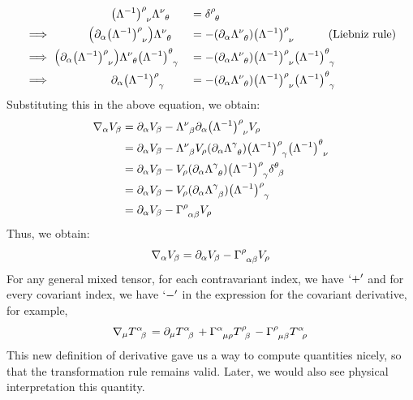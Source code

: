 \begin{alignat*}{2}
    &\qquad\qquad\ \ \ \itrmat{\rho}{\nu}\trmat{\nu}{\theta} &&= \tensor{\delta}{^\rho _\theta} \\
    \implies\ &\qquad\quad\qty(\partial_\alpha \itrmat{\rho}{\nu}) \trmat{\nu}{\theta} &&= -\qty(\partial_\alpha \trmat{\nu}{\theta})\itrmat{\rho}{\nu} \qquad\quad  (\text{Liebniz rule})\\
    \implies\ &\qty(\partial_\alpha \itrmat{\rho}{\nu}) \trmat{\nu}{\theta} \itrmat{\theta}{\gamma} &&= -\qty(\partial_\alpha \trmat{\nu}{\theta})\itrmat{\rho}{\nu}\itrmat{\theta}{\gamma} \\
    \implies\ &\qquad\qquad\ \ \ \partial_\alpha \itrmat{\rho}{\gamma} &&= - \qty(\partial_\alpha \trmat{\nu}{\theta})\itrmat{\rho}{\nu}\itrmat{\theta}{\gamma}
\end{alignat*}
Substituting this in the above equation, we obtain:
\begin{align*}
    \covd{\alpha}   V_\beta &= \partial_\alpha V_\beta -\trmat{\nu}{\beta}\partial_\alpha \itrmat{\rho}{\nu}V_\rho\\
&=\partial_\alpha V_\beta -\trmat{\nu}{\beta}V_\rho (\partial_\alpha \trmat{\gamma}{\theta})\itrmat{\rho}{\gamma}\itrmat{\theta}{\nu}\\
&=\partial_\alpha V_\beta -V_\rho (\partial_\alpha \trmat{\gamma}{\theta})\itrmat{\rho}{\gamma}\tensor{\delta}{^\theta _\beta}\\
&=\partial_\alpha V_\beta -V_\rho (\partial_\alpha \trmat{\gamma}{\beta})\itrmat{\rho}{\gamma}\\
&=\partial_\alpha V_\beta -\chris{\rho}{\alpha}{\beta} V_\rho
\end{align*}
Thus, we obtain:
$$\covd{\alpha}   V_\beta =\partial_\alpha V_\beta -\chris{\rho}{\alpha}{\beta} V_\rho $$
For any general mixed tensor, for each contravariant index, we have $`+'$ and for every covariant index, we have $`-'$ in the expression for the covariant derivative, for example,
$$\covd{\mu}\tensor{T}{^\alpha _\beta} = \partial_\mu \tensor{T}{^\alpha _\beta} + \chris{\alpha}{\mu}{\rho}\tensor{T}{^\rho _\beta} - \chris{\rho}{\mu}{\beta}\tensor{T}{^\alpha _\rho}$$
This new definition of derivative gave us a way to compute quantities nicely, so that the transformation rule remains valid. Later, we would also see physical interpretation this quantity.